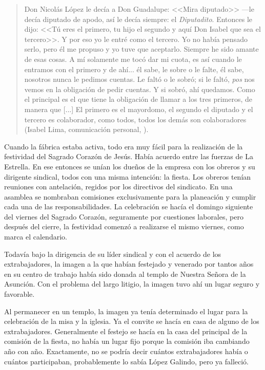 \documentclass[14pt,letterpaper,twoside]{extbook} %
\begin{document}
\begin{quotation}
\noindent Don Nicolás López le decía a Don Guadalupe: <<Mira diputado>> ---le decía diputado de apodo, así le decía siempre: el \textit{Diputadito}. Entonces le dijo: <<Tú eres el primero, tu hijo el segundo y aquí Don Isabel que sea el tercero>>. Y por eso yo le entré como el tercero. Yo no había pensado serlo, pero él me propuso y yo tuve que aceptarlo. Siempre he sido amante de esas cosas. A mí solamente me tocó dar mi cuota, es así cuando le entramos con el primero y de ahí... él sabe, le sobre o le falte, él sabe, nosotros nunca le pedimos cuentas. Le faltó o le sobró; si le faltó, \textit{pos} nos vemos en la obligación de pedir cuentas. Y si sobró, ahí quedamos. Como el principal es el que tiene la obligación de llamar a los tres primeros, de manera que [...] El primero es el mayordomo, el segundo el diputado y el tercero es colaborador, como todos, todos los demás son colaboradores (Isabel Lima, comunicación personal, ).
\end{quotation}

\noindent Cuando la fábrica estaba activa, todo era muy fácil para la realización de la festividad del Sagrado Corazón de Jesús. Había acuerdo entre las fuerzas de La Estrella. En ese entonces se unían los dueños de la empresa con los obreros y su dirigente sindical, todos con una misma intención: la fiesta. Los obreros tenían reuniones con antelación, regidos por los directivos del sindicato. En una asamblea se nombraban comisiones exclusivamente para la planeación y cumplir cada una de las responsabilidades. La celebración se hacía el domingo siguiente del viernes del Sagrado Corazón, seguramente por cuestiones laborales, pero después del cierre, la festividad comenzó a realizarse el mismo viernes, como marca el calendario.

Todavía bajo la dirigencia de su líder sindical y con el acuerdo de los extrabajadores, la imagen a la que habían festejado y venerado por tantos años en su centro de trabajo había sido donada al templo de Nuestra Señora de la Asunción. Con el problema del largo litigio, la
imagen tuvo ahí un lugar seguro y favorable.

Al permanecer en un templo, la imagen ya tenía determinado el lugar para la celebración de la misa y la iglesia. Ya el convite se hacía en casa de alguno de los extrabajadores. Generalmente el festejo se hacía en la casa del principal de la comisión de la fiesta, no había un lugar fijo porque la comisión iba cambiando año con año. Exactamente, no se podría decir cuántos extrabajadores había o cuántos participaban, probablemente lo sabía López Galindo, pero ya falleció.
\end{document}

